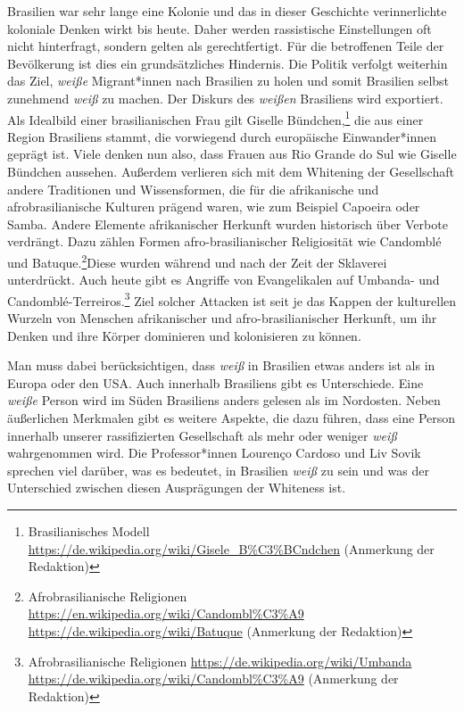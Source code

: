 \documentclass[a4paper,
fontsize=11pt,
oneside,
numbers=noperiodatend,
parskip=half-,
bibliography=totoc,
final
]{scrartcl}
\begin{document}
Brasilien war sehr lange eine Kolonie und das in dieser Geschichte
verinnerlichte koloniale Denken wirkt bis heute. Daher werden
rassistische Einstellungen oft nicht hinterfragt, sondern gelten als
gerechtfertigt. Für die betroffenen Teile der Bevölkerung ist dies ein
grundsätzliches Hindernis. Die Politik verfolgt weiterhin das Ziel,
\emph{weiße} Migrant*innen nach Brasilien zu holen und somit Brasilien
selbst zunehmend \emph{weiß} zu machen. Der Diskurs des \emph{weißen}
Brasiliens wird exportiert. Als Idealbild einer brasilianischen Frau
gilt Giselle Bündchen,\footnote{Brasilianisches Modell
  \url{https://de.wikipedia.org/wiki/Gisele_B\%C3\%BCndchen} (Anmerkung
  der Redaktion)} die aus einer Region Brasiliens stammt, die vorwiegend
durch europäische Einwander*innen geprägt ist. Viele denken nun also,
dass Frauen aus Rio Grande do Sul wie Giselle Bündchen aussehen.
Außerdem verlieren sich mit dem Whitening der Gesellschaft andere
Traditionen und Wissensformen, die für die afrikanische und
afrobrasilianische Kulturen prägend waren, wie zum Beispiel Capoeira
oder Samba. Andere Elemente afrikanischer Herkunft wurden historisch
über Verbote verdrängt. Dazu zählen Formen afro-brasilianischer
Religiosität wie Candomblé und Batuque.\footnote{Afrobrasilianische
  Religionen \url{https://en.wikipedia.org/wiki/Candombl\%C3\%A9}
  \url{https://de.wikipedia.org/wiki/Batuque} (Anmerkung der Redaktion)}Diese
wurden während und nach der Zeit der Sklaverei unterdrückt. Auch heute
gibt es Angriffe von Evangelikalen auf Umbanda- und
Candomblé-Terreiros.\footnote{Afrobrasilianische Religionen
  \url{https://de.wikipedia.org/wiki/Umbanda}
  \url{https://de.wikipedia.org/wiki/Candombl\%C3\%A9} (Anmerkung der
  Redaktion)} Ziel solcher Attacken ist seit je das Kappen der
kulturellen Wurzeln von Menschen afrikanischer und afro-brasilianischer
Herkunft, um ihr Denken und ihre Körper dominieren und kolonisieren zu
können.

Man muss dabei berücksichtigen, dass \emph{weiß} in Brasilien etwas
anders ist als in Europa oder den USA. Auch innerhalb Brasiliens gibt es
Unterschiede. Eine \emph{weiße} Person wird im Süden Brasiliens anders
gelesen als im Nordosten. Neben äußerlichen Merkmalen gibt es weitere
Aspekte, die dazu führen, dass eine Person innerhalb unserer
rassifizierten Gesellschaft als mehr oder weniger \emph{weiß}
wahrgenommen wird. Die Professor*innen Lourenço Cardoso und Liv Sovik
sprechen viel darüber, was es bedeutet, in Brasilien \emph{weiß} zu sein
und was der Unterschied zwischen diesen Ausprägungen der Whiteness ist.
\end{document}
